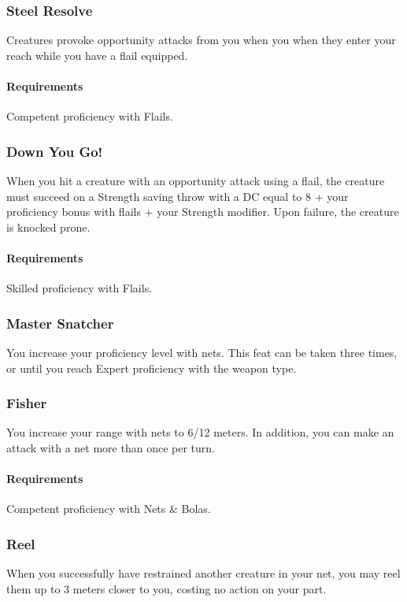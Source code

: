 \subsubsection{Steel Resolve} \label{feat::steelresolve}
    Creatures provoke opportunity attacks from you when you when they enter your reach while you have a flail equipped.
    \paragraph{Requirements} Competent proficiency with Flails.
\subsubsection{Down You Go!} \label{feat::downyougo}
    When you hit a creature with an opportunity attack using a flail, the creature must succeed on a Strength saving throw with a DC equal to 8 + your proficiency bonus with flails + your Strength modifier.
    Upon failure, the creature is knocked prone.
    \paragraph{Requirements} Skilled proficiency with Flails.
\subsubsection{Master Snatcher} \label{feat::snatcher}
    You increase your proficiency level with nets.
    This feat can be taken three times, or until you reach Expert proficiency with the weapon type.
\subsubsection{Fisher} \label{feat::fisher}
    You increase your range with nets to 6/12 meters.
    In addition, you can make an attack with a net more than once per turn.
    \paragraph{Requirements} Competent proficiency with Nets \& Bolas.
\subsubsection{Reel} \label{feat::reel}
    When you successfully have restrained another creature in your net, you may reel them up to 3 meters closer to you, costing no action on your part.

